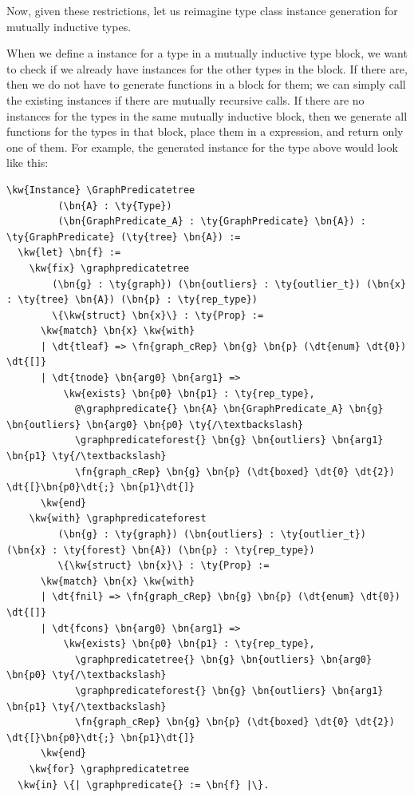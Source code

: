 Now, given these restrictions, let us reimagine type class instance generation for mutually inductive types.

When we define a \GraphPredicate{} instance for a type in a mutually inductive type block, we want to check if we already have \GraphPredicate{} instances for the other types in the block. If there are, then we do not have to generate \graphpredicate{} functions in a  block for them; we can simply call the existing instances if there are mutually recursive calls. If there are no instances for the types in the same mutually inductive block, then we generate all \graphpredicate{} functions for the types in that block, place them in a  expression, and return only one of them. For example, the generated \GraphPredicate{} instance for the  type above would look like this:

\label{code:GraphPredicatetree}
\newcommand{\GraphPredicatetree}{\hyperref[code:GraphPredicatetree]{\fn{GraphPredicate\_\linebreak[0]tree}}}
\newcommand{\graphpredicatetree}{\hyperref[code:GraphPredicatetree]{\fn{graph\_\linebreak[0]predicate\_\linebreak[0]tree}}}
\newcommand{\graphpredicateforest}{\hyperref[code:GraphPredicatetree]{\fn{graph\_\linebreak[0]predicate\_\linebreak[0]forest}}}
\begin{Verbatim}
\kw{Instance} \GraphPredicatetree
         (\bn{A} : \ty{Type})
         (\bn{GraphPredicate_A} : \ty{GraphPredicate} \bn{A}) : \ty{GraphPredicate} (\ty{tree} \bn{A}) :=
  \kw{let} \bn{f} :=
    \kw{fix} \graphpredicatetree
        (\bn{g} : \ty{graph}) (\bn{outliers} : \ty{outlier_t}) (\bn{x} : \ty{tree} \bn{A}) (\bn{p} : \ty{rep_type}) 
        \{\kw{struct} \bn{x}\} : \ty{Prop} :=
      \kw{match} \bn{x} \kw{with}
      | \dt{tleaf} => \fn{graph_cRep} \bn{g} \bn{p} (\dt{enum} \dt{0}) \dt{[]}
      | \dt{tnode} \bn{arg0} \bn{arg1} =>
          \kw{exists} \bn{p0} \bn{p1} : \ty{rep_type},
            @\graphpredicate{} \bn{A} \bn{GraphPredicate_A} \bn{g} \bn{outliers} \bn{arg0} \bn{p0} \ty{/\textbackslash}
            \graphpredicateforest{} \bn{g} \bn{outliers} \bn{arg1} \bn{p1} \ty{/\textbackslash}
            \fn{graph_cRep} \bn{g} \bn{p} (\dt{boxed} \dt{0} \dt{2}) \dt{[}\bn{p0}\dt{;} \bn{p1}\dt{]}
      \kw{end}
    \kw{with} \graphpredicateforest
         (\bn{g} : \ty{graph}) (\bn{outliers} : \ty{outlier_t}) (\bn{x} : \ty{forest} \bn{A}) (\bn{p} : \ty{rep_type})
         \{\kw{struct} \bn{x}\} : \ty{Prop} :=
      \kw{match} \bn{x} \kw{with}
      | \dt{fnil} => \fn{graph_cRep} \bn{g} \bn{p} (\dt{enum} \dt{0}) \dt{[]}
      | \dt{fcons} \bn{arg0} \bn{arg1} =>
          \kw{exists} \bn{p0} \bn{p1} : \ty{rep_type},
            \graphpredicatetree{} \bn{g} \bn{outliers} \bn{arg0} \bn{p0} \ty{/\textbackslash}
            \graphpredicateforest{} \bn{g} \bn{outliers} \bn{arg1} \bn{p1} \ty{/\textbackslash}
            \fn{graph_cRep} \bn{g} \bn{p} (\dt{boxed} \dt{0} \dt{2}) \dt{[}\bn{p0}\dt{;} \bn{p1}\dt{]}
      \kw{end}
    \kw{for} \graphpredicatetree
  \kw{in} \{| \graphpredicate{} := \bn{f} |\}.
\end{Verbatim}

